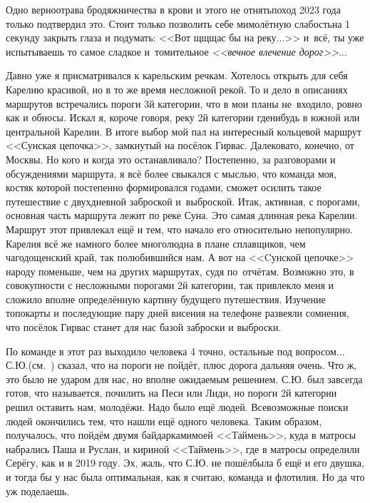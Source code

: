 {Одно верно\mdash отрава бродяжничества в крови и этого не отнять\mdash поход 2023 года только подтвердил это. Стоит только позволить себе мимолётную слабость\mdash на 1 секунду закрыть глаза и подумать: <<Вот щ\sdash щ\sdash щас бы на реку$\ldots$>> и~всё, ты уже испытываешь то самое сладкое и~томительное \textit{<<вечное влечение дорог>>}$\ldots$

Давно уже я присматривался к карельским речкам. Хотелось открыть для себя Карелию красивой, но в то же время несложной рекой. То и дело в описаниях маршрутов встречались пороги 3\sdash й категории, что в мои планы не~входило, ровно как и обносы. Искал я, короче говоря, реку 2\sdash й категории где\sdash нибудь в южной или центральной Карелии. В итоге выбор мой пал на интересный кольцевой маршрут <<Сунская цепочка>>, замкнутый на посёлок Гирвас. Далековато, конечно, от Москвы. Но кого и когда это останавливало? Постепенно, за разговорами и обсуждениями маршрута, я всё более свыкался с мыслью, что команда моя, костяк которой постепенно формировался годами, сможет осилить такое путешествие с двухдневной заброской и~выброской. Итак, активная, с порогами, основная часть маршрута лежит по реке Суна. Это самая длинная река Карелии. Маршрут этот привлекал ещё и тем, что начало его относительно непопулярно. Карелия всё же намного более многолюдна в плане сплавщиков, чем чагодощенский край, так полюбившийся нам. А вот на <<Cунской цепочке>> народу поменьше, чем на других маршрутах, судя по~отчётам. Возможно это, в совокупности с несложными порогами 2\sdash й категории, так привлекло меня и сложило вполне определённую картину будущего путешествия. Изучение топокарты и последующие пару дней висения на телефоне развеяли сомнения, что посёлок Гирвас станет для нас базой заброски и выброски.

По команде в этот раз выходило человека 4 точно, остальные под вопросом$\ldots$ С.Ю.(см.~\cite{СоболевВепсскаяЛетопись}) сказал, что на пороги не пойдёт, плюс дорога дальняя очень. Что ж, это было не ударом для нас, но вполне ожидаемым решением. С.Ю. был завсегда готов, что называется, почилить на Песи или Лиди, но пороги 2\sdash й категории решил оставить нам, молодёжи. Надо было ещё людей. Всевозможные поиски людей окончились тем, что нашли ещё одного человека. Таким образом, получалось, что пойдём двумя байдарками\mdash моей <<Таймень>>, куда в матросы набрались Паша и Руслан, и кириной <<Таймень>>, где в матросы определили Серёгу, как и в 2019 году. Эх, жаль, что С.Ю. не пошёл\mdash была б ещё и его двушка, и тогда бы у нас была оптимальная, как я считаю, команда и флотилия. Но да что уж поделаешь. 

}
